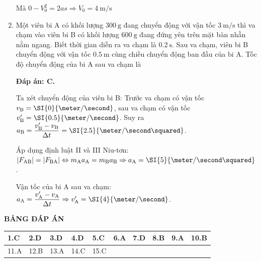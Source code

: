\begin{enumerate}[label=\bfseries Câu \arabic*:]
{	Mà $0-V_0^2 = 2as \Rightarrow V_0 = 4\ \text{m/s}$
}
\item {}

\cauhoi
{Một viên bi A có khối lượng $\SI{300}{\gram}$ đang chuyển động với vận tốc $\SI{3}{\meter / \second}$ thì va chạm vào viên bi B có khối lượng $\SI{600}{\gram}$ đang đứng yên trên mặt bàn nhẵn nằm ngang. Biết thời gian diễn ra va chạm là $\SI{0.2}{\second}$. Sau va chạm, viên bi B chuyển động với vận tốc $\SI{0.5}{\meter}$ cùng chiều chuyển động ban đầu của bi A. Tốc độ chuyển động của bi A sau va chạm là
	\begin{mcq}(4)
		\item $\SI{1}{\meter / \second}$.
		\item $\SI{3}{\meter / \second}$.
		\item $\SI{4}{\meter / \second}$.
		\item $\SI{2}{\meter / \second}$.
	\end{mcq}
}

\loigiai
{	\textbf{Đáp án: C.}
	
	Ta xét chuyển động của viên bi B: Trước va chạm có vận tốc $v_\text B = \SI{0}{\meter / \second}$, sau va chạm có vận tốc $v_\text B'=\SI{0.5}{\meter/ \second}$. Suy ra $a_\text B=\dfrac{v_\text B'-v_\text B}{\Delta t}=\SI{2.5}{\meter / \second \squared}$.
	
	Áp dụng định luật II và III Niu-tơn:
	$|F_\text {AB}| = |F_\text {BA}| \Leftrightarrow m_\text A a_\text A = m_\text B a_\text B \Rightarrow a_\text A = \SI{5}{\meter / \second \squared}$.
	
	Vận tốc của bi A sau va chạm: $a_\text A = \dfrac{v_\text A'-v_\text A}{\Delta t}\Rightarrow v_\text A' = \SI{4}{\meter / \second}$.
}


\end{enumerate}

\whiteBGstarEnd

\loigiai
{
	\begin{center}
		\textbf{BẢNG ĐÁP ÁN}
	\end{center}
	\begin{center}
		\begin{tabular}{|m{2.8em}|m{2.8em}|m{2.8em}|m{2.8em}|m{2.8em}|m{2.8em}|m{2.8em}|m{2.8em}|m{2.8em}|m{2.8em}|}
			\hline
			1.C  & 2.D  & 3.D  & 4.D  & 5.C  & 6.A  & 7.D  & 8.B  & 9.A  & 10.B  \\
			\hline
			11.A  & 12.B  & 13.A  & 14.C  & 15.C  & &  &  &  &  \\
			\hline
			
		\end{tabular}
	\end{center}
}
